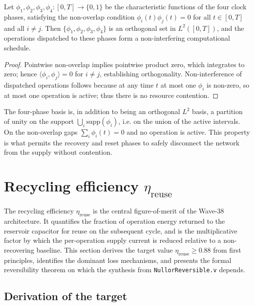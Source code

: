 \begin{theorem}\label{thm:four_phase_orth}
Let $\phi_1, \phi_2, \phi_3, \phi_4 : [0,T] \to \{0,1\}$ be the characteristic
functions of the four clock phases, satisfying the non-overlap condition
$\phi_i(t) \phi_j(t) = 0$ for all $t \in [0,T]$ and all $i \neq j$.  Then
$\{\phi_1, \phi_2, \phi_3, \phi_4\}$ is an orthogonal set in $L^2([0,T])$, and
the operations dispatched to these phases form a non-interfering computational
schedule.
\end{theorem}
\begin{proof}
Pointwise non-overlap implies pointwise product zero, which integrates to zero;
hence $\langle \phi_i, \phi_j \rangle = 0$ for $i \neq j$, establishing
orthogonality.  Non-interference of dispatched operations follows because at any time
$t$ at most one $\phi_i$ is non-zero, so at most one operation is active; thus there
is no resource contention.
\end{proof}
\begin{remark}
The four-phase basis is, in addition to being an orthogonal $L^2$ basis, a partition
of unity on the support $\bigcup_i \mathrm{supp}(\phi_i)$, i.e. on the union of the
active intervals.  On the non-overlap gaps $\sum_i \phi_i(t) = 0$ and no operation is
active.  This property is what permits the recovery and reset phases to safely
disconnect the network from the supply without contention.
\end{remark}

\section{Recycling efficiency $\eta_{\text{reuse}}$}
\label{sec:eta_reuse}

The recycling efficiency $\eta_{\text{reuse}}$ is the central figure-of-merit of the
Wave-38 architecture.  It quantifies the fraction of operation energy returned to the
reservoir capacitor for reuse on the subsequent cycle, and is the multiplicative
factor by which the per-operation supply current is reduced relative to a non-
recovering baseline.  This section derives the target value $\eta_{\text{reuse}}
\geq 0.88$ from first principles, identifies the dominant loss mechanisms, and
presents the formal reversibility theorem on which the synthesis from
\texttt{NullorReversible.v} depends.

\subsection{Derivation of the target}
\label{subsec:eta_target}


